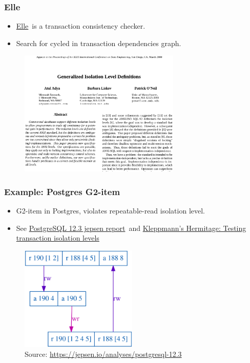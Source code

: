 \documentclass[10pt,utf8]{beamer}
\begin{document}
\begin{frame}
    \frametitle{Elle}
    \begin{itemize}
      \item \color{blue}\href{https://github.com/jepsen-io/elle}{Elle}\color{black}~is a transaction consistency checker.
      \item Search for cycled in transaction dependencies graph.
    \end{itemize}
    \begin{figure}
        \centering
        \includegraphics[height=6cm]{./img/adya_paper.eps}
    \end{figure}
\end{frame}

\begin{frame}
    \frametitle{Example: Postgres G2-item}
    \begin{itemize}
      \item G2-item in Postgres, violates repeatable-read isolation level.
      \item See \color{blue}\href{https://jepsen.io/analyses/postgresql-12.3}{PostgreSQL 12.3 jepsen report}\color{black}~and \color{blue}\href{https://github.com/ept/hermitage/blob/master/postgres.md\#write-skew-g2-item}{Kleppmann's Hermitage: Testing transaction isolation levels}\color{black}
    \end{itemize}
    \begin{figure}
        \centering
        \includegraphics[height=5cm]{./img/postgres_g2.eps}
         \caption{\tiny{Source: \url{https://jepsen.io/analyses/postgresql-12.3}}}
    \end{figure}
\end{frame}
\end{document}
